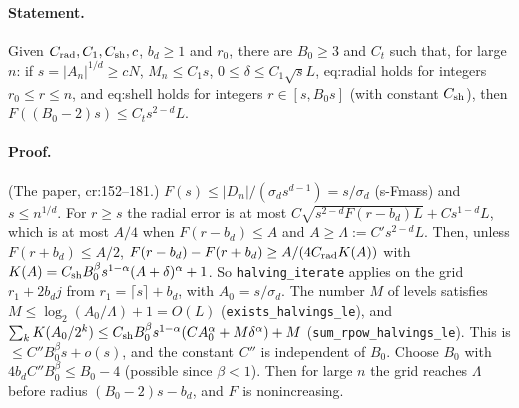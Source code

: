\paragraph{Statement.} Given $C_{\rm rad},C_1,C_{\rm sh},c$, $b_d\geq1$ and $r_0$, there are $B_0\geq3$ and $C_t$ such that, for large $n$: if $s=|A_n|^{1/d}\geq cN$, $M_n\leq C_1s$,
$0\leq\delta\leq C_1\sqrt sL$, eq:radial holds for integers $r_0\leq r\leq n$, and eq:shell holds for integers $r\in[s,B_0s]$ (with constant $C_{\rm sh}$), then
$F((B_0-2)s)\leq C_ts^{2-d}L$.
\paragraph{Proof.} (The paper, cr:152--181.) $F(s)\leq|D_n|/(\sigma_ds^{d-1})=s/\sigma_d$ (s-Fmass) and $s\leq n^{1/d}$. For $r\geq s$ the radial error is at most
$C\sqrt{s^{2-d}F(r-b_d)L}+Cs^{1-d}L$, which is at most $A/4$ when $F(r-b_d)\leq A$ and $A\geq\Lambda:=C's^{2-d}L$. Then, unless $F(r+b_d)\leq A/2$,
$F(r-b_d)-F(r+b_d)\geq A/(4C_{\rm rad}K(A))$ with $K(A)=C_{\rm sh}B_0^\beta s^{1-\alpha}(A+\delta)^\alpha+1$. So \texttt{halving\_iterate} applies on the grid
$r_1+2b_dj$ from $r_1=\lceil s\rceil+b_d$, with $A_0=s/\sigma_d$. The number $M$ of levels satisfies $M\leq\log_2(A_0/\Lambda)+1=O(L)$ (\texttt{exists\_halvings\_le}), and
$\sum_kK(A_0/2^k)\leq C_{\rm sh}B_0^\beta s^{1-\alpha}(CA_0^\alpha+M\delta^\alpha)+M$ (\texttt{sum\_rpow\_halvings\_le}). This is $\leq C''B_0^\beta s+o(s)$, and the constant $C''$
is independent of $B_0$. Choose $B_0$ with $4b_dC''B_0^\beta\leq B_0-4$ (possible since $\beta<1$). Then for large $n$ the grid reaches $\Lambda$ before radius
$(B_0-2)s-b_d$, and $F$ is nonincreasing.
